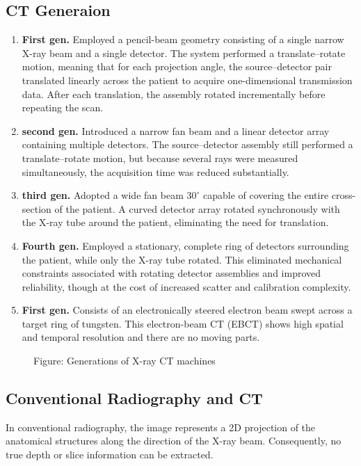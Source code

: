 \documentclass[../../../main.tex]{subfiles}
\begin{document}
\subsection{CT Generaion}
\begin{enumerate}
    \item \textbf{First gen.} Employed a pencil-beam geometry consisting of a single narrow X-ray beam and a single detector. The system performed a translate–rotate motion, meaning that for each projection angle, the source–detector pair translated linearly across the patient to acquire one-dimensional transmission data. After each translation, the assembly rotated incrementally before repeating the scan.
    \item \textbf{second gen.} Introduced a narrow fan beam and a linear detector array containing multiple detectors. The source–detector assembly still performed a translate–rotate motion, but because several rays were measured simultaneously, the acquisition time was reduced substantially.
    \item \textbf{third gen.} Adopted a wide fan beam $30 ^\circ$ capable of covering the entire cross-section of the patient. A curved detector array rotated synchronously with the X-ray tube around the patient, eliminating the need for translation.
    \item \textbf{Fourth gen.} Employed a stationary, complete ring of detectors surrounding the patient, while only the X-ray tube rotated. This eliminated mechanical constraints associated with rotating detector assemblies and improved reliability, though at the cost of increased scatter and calibration complexity.
    \item \textbf{First gen.} Consists of an electronically steered electron beam swept across a target ring of tungsten. This electron-beam CT (EBCT) shows high spatial and temporal resolution and there are no moving parts. 
\end{enumerate}
\begin{figure*}
    \centering
    \caption*{Figure: Generations of X-ray CT machines}
\end{figure*}
\subsection{Conventional Radiography and CT}
In conventional radiography, the image represents a 2D projection of the anatomical structures along the direction of the X-ray beam.
Consequently, no true depth or slice information can be extracted.
\end{document}
